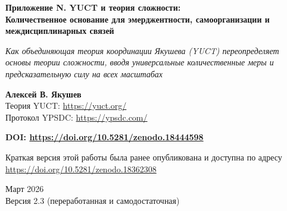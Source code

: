\documentclass[11pt]{article}
\theoremstyle{remark}
\newcommand{\Keff}{K_{\mathrm{eff}}}
\begin{document}
	
	\begin{titlepage}
		\centering
		\vspace*{0cm}
		{\Huge\textbf{Приложение N. YUCT и теория сложности: \\ Количественное основание для эмерджентности, самоорганизации и междисциплинарных связей}\par}
		\vspace{1.2cm}
		{\small\textit{Как объединяющая теория координации Якушева (YUCT) переопределяет основы теории сложности, вводя универсальные количественные меры и предсказательную силу на всех масштабах}}\par
		\vspace{1.2cm}
		{\small\textbf{Алексей В. Якушев} \\}
		Теория YUCT: \url{https://yuct.org/}\\
		Протокол YPSDC: \url{https://ypsdc.com/}\par
		\vspace{2cm}
		\textbf{DOI: \url{https://doi.org/10.5281/zenodo.18444598}}\par
		\vspace{1cm}
		Краткая версия этой работы была ранее опубликована и доступна по адресу\\ \url{https://doi.org/10.5281/zenodo.18362308}\par
		\vspace{1cm}
		Март 2026 \\ Версия 2.3 (переработанная и самодостаточная)\par
		\newpage
		\begin{abstract}
			\noindent
			В этом приложении представлено систематическое изложение того, как объединяющая теория координации Якушева (YUCT) преобразует теорию сложности из набора качественных концепций (эмерджентность, самоорганизация, степенные законы) в количественную, предсказательную науку. Ключевые элементы: (i) эффективность координации \(\Keff\) как универсальная мера организации системы с единым операциональным определением; (ii) фундаментальный закон масштабирования ошибки \(\varepsilon = \kappa_c \alpha \Keff^{-\beta}\) с показателем \(\beta = 0,67\) (выведен в приложении L и приведён здесь), объясняющий происхождение степенных законов в разных областях; (iii) протокол YPSDC, раскрывающий механизм самоорганизации через разделение словарей и индексов; (iv) 19-мерная геометрия с 120 секторами и 7140 связями \(\kappa_{sr}\) (приложение A), обеспечивающая математическую структуру для междисциплинарного моделирования; (v) самодостаточное резюме эмпирической проверки в диапазоне более 50 порядков величины — от энергий атомных связей до флуктуаций космического микроволнового фона; (vi) конкретные проверяемые предсказания в химии, биологии, экономике и исследованиях сознания. Приложение демонстрирует, что возникновение новых свойств соответствует достижению критических значений \(\Keff\), которые могут быть предсказаны теоретически. Оно предлагает единый язык для описания сложности в физических, биологических, социальных и когнитивных системах и закладывает основы для новой научной дисциплины: координационной системологии.

\end{abstract}
\end{titlepage}
\end{document}
